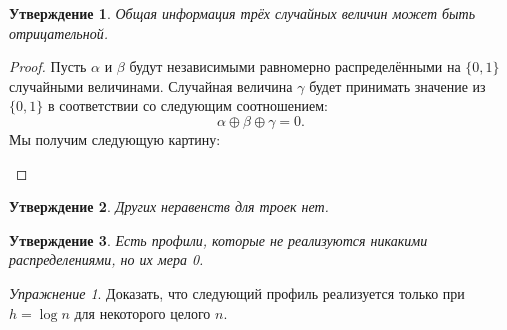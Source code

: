 \documentclass[12pt]{article}
\theoremstyle{definition}
\theoremstyle{plain}
\newtheorem{statement}{Утверждение}[section]
\theoremstyle{remark}
\newtheorem{exercise}{Упражнение}[section]
\begin{document}
\begin{statement}
    Общая информация трёх случайных величин может быть отрицательной.
\end{statement}
\begin{proof}
    Пусть $\alpha$ и $\beta$ будут независимыми равномерно распределёнными на $\{0,1\}$ случайными
    величинами. Случайная величина $\gamma$ будет принимать значение из $\{0,1\}$ в соответствии со
    следующим соотношением:
    \[
        \alpha\oplus\beta\oplus\gamma = 0.
    \]
    Мы получим следующую картину:

    \begin{center}
    \end{center}
\end{proof}
\begin{statement}
    Других неравенств для троек нет.
\end{statement}
\begin{statement}
        Есть профили, которые не реализуются никакими распределениями, но их мера 0.
\end{statement}
\begin{exercise}
    Доказать, что следующий профиль реализуется только при $h=\log n$ для некоторого целого $n$.
    \begin{center}
    \end{center}
\end{exercise}
\end{document}
